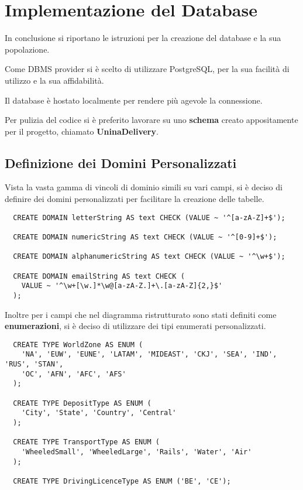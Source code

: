\chapter{Implementazione del Database}

In conclusione si riportano le istruzioni per la creazione del database e la sua popolazione.

Come DBMS provider si è scelto di utilizzare PostgreSQL, per la sua facilità di utilizzo e la sua affidabilità.

Il database è hostato localmente per rendere più agevole la connessione.

Per pulizia del codice si è preferito lavorare su uno \textbf{schema} creato appositamente per il progetto, chiamato \textbf{UninaDelivery}.

\section{Definizione dei Domini Personalizzati}

Vista la vasta gamma di vincoli di dominio simili su vari campi, si è deciso di definire dei domini personalizzati per facilitare la creazione delle tabelle.

\begin{lstlisting}
  CREATE DOMAIN letterString AS text CHECK (VALUE ~ '^[a-zA-Z]+$');
  
  CREATE DOMAIN numericString AS text CHECK (VALUE ~ '^[0-9]+$');
  
  CREATE DOMAIN alphanumericString AS text CHECK (VALUE ~ '^\w+$');
  
  CREATE DOMAIN emailString AS text CHECK (
    VALUE ~ '^\w+[\w.]*\w@[a-zA-Z.]+\.[a-zA-Z]{2,}$'
  );
\end{lstlisting}

Inoltre per i campi che nel diagramma ristrutturato sono stati definiti come \textbf{enumerazioni}, si è deciso di utilizzare dei tipi enumerati personalizzati.

\begin{lstlisting}
  CREATE TYPE WorldZone AS ENUM (
    'NA', 'EUW', 'EUNE', 'LATAM', 'MIDEAST', 'CKJ', 'SEA', 'IND', 'RUS', 'STAN', 
    'OC', 'AFN', 'AFC', 'AFS'
  );

  CREATE TYPE DepositType AS ENUM (
    'City', 'State', 'Country', 'Central'
  );

  CREATE TYPE TransportType AS ENUM (
    'WheeledSmall', 'WheeledLarge', 'Rails', 'Water', 'Air'
  );
  
  CREATE TYPE DrivingLicenceType AS ENUM ('BE', 'CE');
\end{lstlisting}

